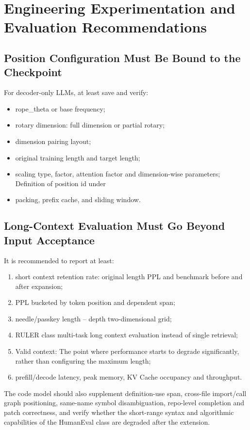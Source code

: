 \documentclass[UTF8,fontset=none,a4paper,10pt]{ctexart}
\begin{document}
\section{Engineering Experimentation and Evaluation Recommendations}

\subsection{Position Configuration Must Be Bound to the Checkpoint}

For decoder-only LLMs, at least save and verify:
\begin{itemize}
\item \textnormal{rope\_theta} or base frequency;
\item rotary dimension: full dimension or partial rotary;
\item dimension pairing layout;
\item original training length and target length;
\item scaling type, factor, attention factor and dimension-wise parameters;
Definition of position id under \item packing, prefix cache, and sliding window.
\end{itemize}

\subsection{Long-Context Evaluation Must Go Beyond Input Acceptance}

It is recommended to report at least:
\begin{enumerate}
\item short context retention rate: original length PPL and benchmark before and after expansion;
\item PPL bucketed by token position and dependent span;
\item needle/passkey length -- depth two-dimensional grid;
\item RULER class multi-task long context evaluation instead of single retrieval;
\item Valid context: The point where performance starts to degrade significantly, rather than configuring the maximum length;
\item prefill/decode latency, peak memory, KV Cache occupancy and throughput.
\end{enumerate}

The code model should also supplement definition-use span, cross-file import/call graph positioning, same-name symbol disambiguation, repo-level completion and patch correctness, and verify whether the short-range syntax and algorithmic capabilities of the HumanEval class are degraded after the extension.
\end{document}
